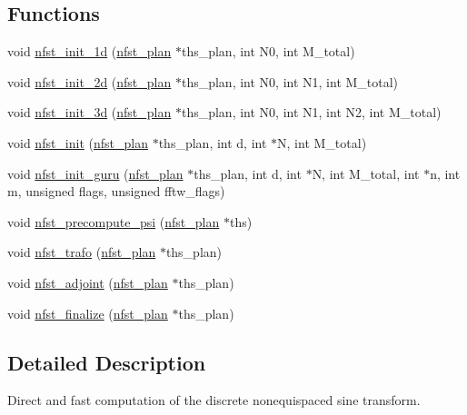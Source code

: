 \subsection*{Functions}
\begin{DoxyCompactItemize}
\item 
void \hyperlink{group__nfst_gac13a4c85f5cd43cfc3b5c3895021a9a9}{nfst\-\_\-init\-\_\-1d} (\hyperlink{structnfst__plan}{nfst\-\_\-plan} $\ast$ths\-\_\-plan, int N0, int M\-\_\-total)
\item 
void \hyperlink{group__nfst_ga44eff771382180419936a6dbf51505fa}{nfst\-\_\-init\-\_\-2d} (\hyperlink{structnfst__plan}{nfst\-\_\-plan} $\ast$ths\-\_\-plan, int N0, int N1, int M\-\_\-total)
\item 
void \hyperlink{group__nfst_gaf1dd972b1831e75d3cfba0a0a2671711}{nfst\-\_\-init\-\_\-3d} (\hyperlink{structnfst__plan}{nfst\-\_\-plan} $\ast$ths\-\_\-plan, int N0, int N1, int N2, int M\-\_\-total)
\item 
void \hyperlink{group__nfst_gae4043a9926de23326b21b8722648bafa}{nfst\-\_\-init} (\hyperlink{structnfst__plan}{nfst\-\_\-plan} $\ast$ths\-\_\-plan, int d, int $\ast$N, int M\-\_\-total)
\item 
void \hyperlink{group__nfst_ga99bcf33a3cc6b3bb4842124d7894cee2}{nfst\-\_\-init\-\_\-guru} (\hyperlink{structnfst__plan}{nfst\-\_\-plan} $\ast$ths\-\_\-plan, int d, int $\ast$N, int M\-\_\-total, int $\ast$n, int m, unsigned flags, unsigned fftw\-\_\-flags)
\item 
void \hyperlink{group__nfst_gaa0cc88f5b76b758181688d3b438526e2}{nfst\-\_\-precompute\-\_\-psi} (\hyperlink{structnfst__plan}{nfst\-\_\-plan} $\ast$ths)
\item 
void \hyperlink{group__nfst_gac80b86521428ec2191919cc96c82f416}{nfst\-\_\-trafo} (\hyperlink{structnfst__plan}{nfst\-\_\-plan} $\ast$ths\-\_\-plan)
\item 
void \hyperlink{group__nfst_ga0ae3871b80dda28e7aabe541a48d34e2}{nfst\-\_\-adjoint} (\hyperlink{structnfst__plan}{nfst\-\_\-plan} $\ast$ths\-\_\-plan)
\item 
void \hyperlink{group__nfst_gab5d03eeff969c872061d96998f9f0405}{nfst\-\_\-finalize} (\hyperlink{structnfst__plan}{nfst\-\_\-plan} $\ast$ths\-\_\-plan)
\end{DoxyCompactItemize}


\subsection{Detailed Description}
Direct and fast computation of the discrete nonequispaced sine transform. 

